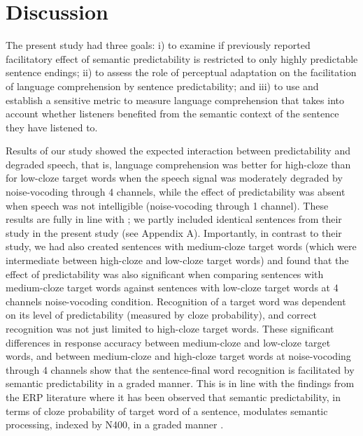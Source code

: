 \documentclass[a4paper, nobind]{templates/ociamthesis}
\begin{document}
\hypertarget{discussion-1}{%
\section{Discussion}\label{discussion-1}}

The present study had three goals: i) to examine if previously reported facilitatory effect of semantic predictability is restricted to only highly predictable sentence endings;
ii) to assess the role of perceptual adaptation on the facilitation of language comprehension by sentence predictability; and
iii) to use and establish a sensitive metric to measure language comprehension that takes into account whether listeners benefited from the semantic context of the sentence they have listened to.

Results of our study showed the expected interaction between predictability and degraded speech, that is, language comprehension was better for high-cloze than for low-cloze target words when the speech signal was moderately degraded by noise-vocoding through 4 channels, while the effect of predictability was absent when speech was not intelligible (noise-vocoding through 1 channel).
These results are fully in line with \textcite{Obleser2010};
we partly included identical sentences from their study in the present study (see Appendix A).
Importantly, in contrast to their study, we had also created sentences with medium-cloze target words (which were intermediate between high-cloze and low-cloze target words) and found that the effect of predictability was also significant when comparing sentences with medium-cloze target words against sentences with low-cloze target words at 4 channels noise-vocoding condition.
Recognition of a target word was dependent on its level of predictability (measured by cloze probability), and correct recognition was not just limited to high-cloze target words.
These significant differences in response accuracy between medium-cloze and low-cloze target words, and between medium-cloze and high-cloze target words at noise-vocoding through 4 channels show that the sentence-final word recognition is facilitated by semantic predictability in a graded manner.
This is in line with the findings from the ERP literature where it has been observed that semantic predictability, in terms of cloze probability of target word of a sentence, modulates semantic processing, indexed by N400, in a graded manner \autocite{Delong2005,Wlotko2012,Nieuwland2018}.
\end{document}
